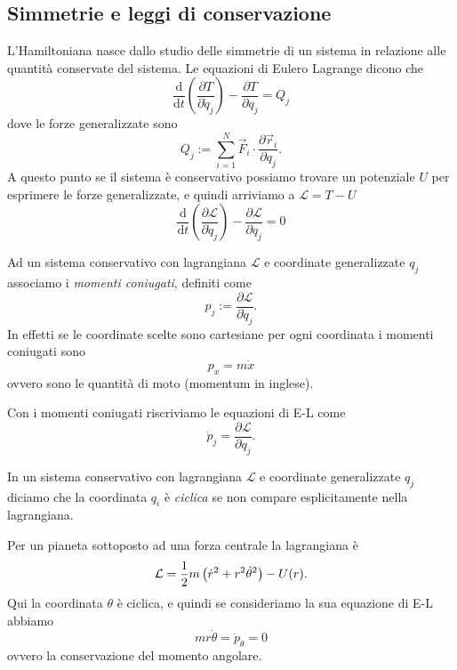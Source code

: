 \documentclass[11pt]{scrartcl}
\newcommand{\dif}{\text{d}}
\newcommand{\posit}{\vec{r}}
\begin{document}
	\newpage
	
	\subsection{Simmetrie e leggi di conservazione}
	
	L'Hamiltoniana nasce dallo studio delle simmetrie di un sistema in relazione alle quantità conservate del sistema. Le equazioni di Eulero Lagrange dicono che 
	$$\frac{\dif}{\dif t}\left(\frac{\partial T}{\partial \dot{q}_j}\right)-\frac{\partial T}{\partial q_j}=Q_j$$
	dove le forze generalizzate sono
	$$Q_j:=\sum_{i=1}^{N}\vec{F}_i\cdot \frac{\partial \posit_i}{\partial q_j}.$$
	A questo punto se il sistema è conservativo possiamo trovare un potenziale $U$ per esprimere le forze generalizzate, e quindi arriviamo a $\mathcal{L}=T-U$
	$$\frac{\dif}{\dif t}\left(\frac{\partial \mathcal{L}}{\partial \dot{q}_j}\right)-\frac{\partial \mathcal{L}}{\partial q_j}=0$$
	\begin{definition}
		Ad un sistema conservativo con lagrangiana $\mathcal{L}$ e coordinate generalizzate $q_j$ associamo i \textit{momenti coniugati}, definiti come
		$$p_j:=\frac{\partial \mathcal{L}}{\partial \dot{q}_j}.$$
		In effetti se le coordinate scelte sono cartesiane per ogni coordinata i momenti coniugati sono
		$$p_x=m\dot{x}$$
		ovvero sono le quantità di moto (momentum in inglese).
	\end{definition} 
	Con i momenti coniugati riscriviamo le equazioni di E-L come 
	$$\dot{p}_j=\frac{\partial \mathcal{L}}{\partial q_j}.$$
	\begin{definition}
		In un sistema conservativo con lagrangiana $\mathcal{L}$ e coordinate generalizzate $q_j$ diciamo che la coordinata $q_i$ è \textit{ciclica} se non compare esplicitamente nella lagrangiana.
	\end{definition}
	\begin{example}[Pianeti]
		Per un pianeta sottoposto ad una forza centrale la lagrangiana è 
		$$\mathcal{L}=\frac{1}{2} m\left(\dot{r}^2+r^2\dot{\theta}^2\right)-U(r).$$
		Qui la coordinata $\theta$ è ciclica, e quindi se consideriamo la sua equazione di E-L abbiamo
		$$mr\dot{\theta}=\dot{p}_\theta=0$$
		ovvero la conservazione del momento angolare.
	\end{example}
\end{document}
